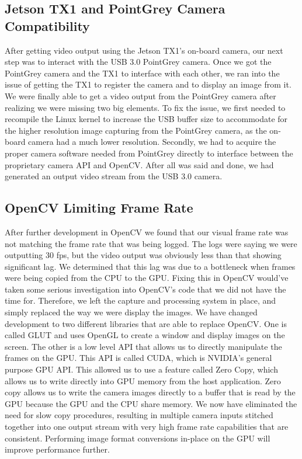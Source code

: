 \documentclass[letterpaper,10pt,titlepage]{IEEEtran}
\begin{document}
   \subsection{Jetson TX1 and PointGrey Camera Compatibility}
   After getting video output using the Jetson TX1's on-board camera, our next step was to interact with the USB 3.0 PointGrey camera. Once we got the PointGrey camera and the TX1 to interface with each other, we ran into the issue of getting the TX1 to register the camera and to display an image from it. We were finally able to get a video output from the PointGrey camera after realizing we were missing two big elements. To fix the issue, we first needed to recompile the Linux kernel to increase the USB buffer size to accommodate for the higher resolution image capturing from the PointGrey camera, as the on-board camera had a much lower resolution. Secondly, we had to acquire the proper camera software needed from PointGrey directly to interface between the proprietary camera API and OpenCV. After all was said and done, we had generated an output video stream from the USB 3.0 camera. 
   
   \subsection{OpenCV Limiting Frame Rate}
   After further development in OpenCV we found that our visual frame rate was not matching the frame rate that was being logged. The logs were saying we were outputting 30 fps, but the video output was obviously less than that showing significant lag. We determined that this lag was due to a bottleneck when frames were being copied from the CPU to the GPU. Fixing this in OpenCV would've taken some serious investigation into OpenCV's code that we did not have the time for. Therefore, we left the capture and processing system in place, and simply replaced the way we were display the images. We have changed development to two different libraries that are able to replace OpenCV. One is called GLUT and uses OpenGL to create a window and display images on the screen. The other is a low level API that allows us to directly manipulate the frames on the GPU. This API is called CUDA, which is NVIDIA's general purpose GPU API. This allowed us to use a feature called Zero Copy, which allows us to write directly into GPU memory from the host application. Zero copy allows us to write the camera images directly to a buffer that is read by the GPU because the GPU and the CPU share memory. We now have eliminated the need for slow copy procedures, resulting in multiple camera inputs stitched together into one output stream with very high frame rate capabilities that are consistent. Performing image format conversions in-place on the GPU will improve performance further. 
\end{document}
